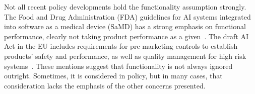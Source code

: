 \documentclass[acmconf,manuscript,screen,natbib=true]{acmart}
\begin{document}



Not all recent policy developments hold the functionality assumption strongly. %
The Food and Drug Administration (FDA) guidelines for AI systems integrated into software as a medical device (SaMD) has a strong emphasis on functional performance, clearly not taking product performance as a given~\cite{FDA}. The draft AI Act in the EU includes requirements for pre-marketing controls to establish products' safety and performance, as well as quality management for high risk systems~\cite{veale_euact}.
These mentions suggest that functionality is not always ignored outright. Sometimes, it is considered in policy, but in many cases, that consideration lacks the emphasis of the other concerns presented. 



\end{document}
